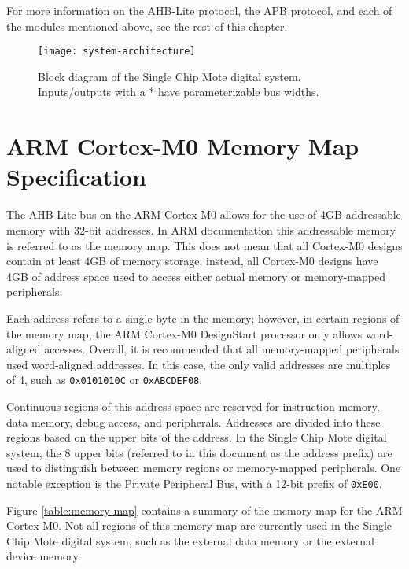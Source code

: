 For more information on the AHB-Lite protocol, the APB protocol, and each of the modules mentioned above, see the rest of this chapter.

\begin{figure}
\centerline{
\texttt{[image: system-architecture]}	
}
\caption{Block diagram of the Single Chip Mote digital system. Inputs/outputs with a * have parameterizable bus widths.}
\label{fig:system-architecture}
\end{figure}

\section{ARM Cortex-M0 Memory Map Specification} \label{memory-map-spec}
The AHB-Lite bus on the ARM Cortex-M0 allows for the use of 4GB addressable memory with 32-bit addresses. In ARM documentation this addressable memory is referred to as the memory map. This does not mean that all Cortex-M0 designs contain at least 4GB of memory storage; instead, all Cortex-M0 designs have 4GB of address space used to access either actual memory or memory-mapped peripherals. 

Each address refers to a single byte in the memory; however, in certain regions of the memory map, the ARM Cortex-M0 DesignStart processor only allows word-aligned accesses. Overall, it is recommended that all memory-mapped peripherals used word-aligned addresses. In this case, the only valid addresses are multiples of 4, such as \texttt{0x0101010C} or \texttt{0xABCDEF08}.

Continuous regions of this address space are reserved for instruction memory, data memory, debug access, and peripherals. Addresses are divided into these regions based on the upper bits of the address. In the Single Chip Mote digital system, the 8 upper bits (referred to in this document as the address prefix) are used to distinguish between memory regions or memory-mapped peripherals. One notable exception is the Private Peripheral Bus, with a 12-bit prefix of \texttt{0xE00}.

Figure \ref{table:memory-map} contains a summary of the memory map for the ARM Cortex-M0. Not all regions of this memory map are currently used in the Single Chip Mote digital system, such as the external data memory or the external device memory.

